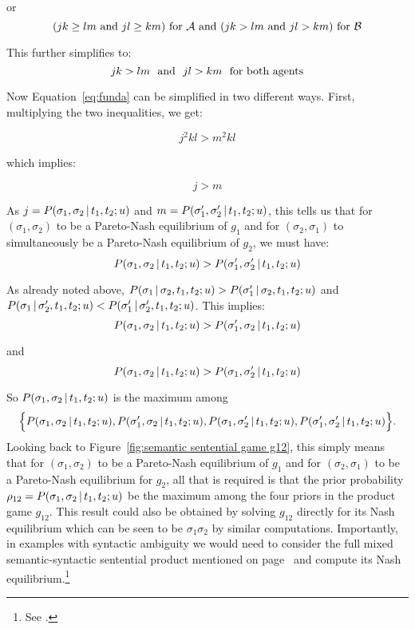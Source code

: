 \noindent or 
\[ (jk \geq lm\ \hbox{and}\ jl \geq km)\ \hbox{for}\ {\cal A}\ \hbox{and}\ (jk > lm\ \hbox{and}\ jl > km)\  \hbox{for}\ {\cal B} \]

\noindent This further simplifies to:
\begin{equation} 
jk > lm\ \ \hbox{and}\ \ jl > km\ \ \hbox{for both agents} \label{eq:funda}
\end{equation}

\noindent Now Equation~\ref{eq:funda} can be simplified in two different ways. First, multiplying the two inequalities, we get:

\[ j^2kl > m^2kl \]

\noindent which implies:

\[ j > m \]


\noindent As $j = P(\sigma_1,\sigma_2 \,|\, t_1, t_2; u)$ and $m = P(\sigma'_1,\sigma'_2 \,|\, t_1, t_2; u)$, this tells us that for $(\sigma_1, \sigma_2)$ to be a Pareto-Nash equilibrium of $g_1$ and for $(\sigma_2, \sigma_1)$ to simultaneously be a Pareto-Nash equilibrium of $g_2$, we must have:
\[ P(\sigma_1,\sigma_2 \,|\, t_1, t_2; u) > P(\sigma'_1,\sigma'_2 \,|\, t_1, t_2; u) \]

\noindent As already noted above, $P(\sigma_1 \,|\, \sigma_2, t_1, t_2; u) > P(\sigma'_1 \,|\, \sigma_2, t_1,\allowbreak t_2; u)$ and $P(\sigma_1 \,|\, \sigma'_2, t_1,\allowbreak t_2; u) < P(\sigma'_1 \,|\, \sigma'_2, t_1, t_2; u)$. This implies:
\[ P(\sigma_1,\sigma_2 \,|\, t_1, t_2; u) > P(\sigma'_1,\sigma_2 \,|\, t_1, t_2; u) \]

\noindent and
\[ P(\sigma_1,\sigma_2 \,|\, t_1, t_2; u) > P(\sigma_1,\sigma'_2 \,|\, t_1, t_2; u) \]

\noindent So $P(\sigma_1,\sigma_2 \,|\, t_1, t_2; u)$ is the maximum among \[\Bigl\{P(\sigma_1,\sigma_2 \cond t_1, t_2; u), P(\sigma'_1,\sigma_2 \cond t_1, t_2; u), P(\sigma_1,\sigma'_2 \cond t_1, t_2; u), \break P(\sigma'_1,\sigma'_2 \cond t_1, t_2; u)\Bigr\}\text{.}\] Looking back to Figure~\ref{fig:semantic sentential game g12}, this simply means that for $(\sigma_1, \sigma_2)$ to be a Pareto-Nash equilibrium of $g_1$ and for $(\sigma_2, \sigma_1)$ to be a Pareto-Nash equilibrium for $g_2$, all that is required is that the prior probability $\rho_{12} = P(\sigma_1,\sigma_2 \,|\, t_1, t_2; u)$ be the maximum among the four priors in the product game $g_{12}$. This result could also be obtained by solving $g_{12}$ directly for its Nash equilibrium which can be seen to be $\sigma_1\sigma_2$ by similar computations. Importantly, in examples with syntactic ambiguity we would need to consider the full mixed semantic-syntactic sentential product mentioned on page~\pageref{page:mixed products} and compute its Nash equilibrium.\footnote{See .}

